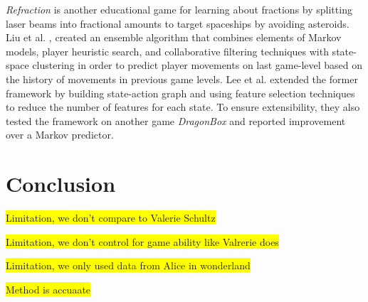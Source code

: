 \documentclass{sigchi}
\newcommand{\hl}[1]{\colorbox{yellow}{#1}}
\begin{document}
\textit {Refraction} is another educational game for learning about fractions by splitting laser beams into fractional amounts to target spaceships by avoiding asteroids. Liu et al. \cite{liu2013predicting}, created an ensemble algorithm that combines elements of Markov models, player heuristic search, and collaborative filtering techniques with state-space clustering in order to predict player movements on last game-level based on the history of movements in previous game levels. Lee et al. \cite{lee2014learning} extended the former framework by building state-action graph and using feature selection techniques to reduce the number of features for each state. To ensure extensibility, they also tested the framework on another game \textit {DragonBox} and reported improvement over a Markov predictor.

\section{Conclusion}
\hl{Limitation, we don't compare to Valerie Schultz}

\hl{Limitation, we don't control for game ability like Valrerie does}

\hl{Limitation, we only used data from Alice in wonderland}

\hl{Method is accuaate}




\end{document}
